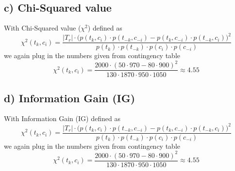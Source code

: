 \documentclass[11pt]{article}
\begin{document}
\subsection*{c) Chi-Squared value}
With Chi-Squared value ($\chi^2$) defined as
\begin{equation}
	\chi^2(t_k, c_i) = \frac{|T_r| \cdot \big( p(t_k, c_i) \cdot p(t_{-k}, c_{-i}) -
						 p(t_{k}, c_{-i}) \cdot p(t_{-k}, c_{i}) \big)^2}
						 {p(t_k) \cdot p(t_{-k}) \cdot p(c_{i}) \cdot p(c_{-i})}
\end{equation}
we again plug in the numbers given from contingency table
\begin{equation}
	\chi^2(t_k, c_i) = \frac{2000 \cdot (50 \cdot 970 - 80 \cdot 900)^2}
					{130 \cdot 1870 \cdot 950 \cdot 1050} 
					\approx 4.55
\end{equation}
\subsection*{d) Information Gain (IG)}
With Information Gain (IG) defined as
\begin{equation}
	\chi^2(t_k, c_i) = \frac{|T_r| \cdot \big( p(t_k, c_i) \cdot p(t_{-k}, c_{-i}) -
						 p(t_{k}, c_{-i}) \cdot p(t_{-k}, c_{i}) \big)^2}
						 {p(t_k) \cdot p(t_{-k}) \cdot p(c_{i}) \cdot p(c_{-i})}
\end{equation}
we again plug in the numbers given from contingency table
\begin{equation}
	\chi^2(t_k, c_i) = \frac{2000 \cdot (50 \cdot 970 - 80 \cdot 900)^2}
					{130 \cdot 1870 \cdot 950 \cdot 1050} 
					\approx 4.55
\end{equation}
\end{document}
